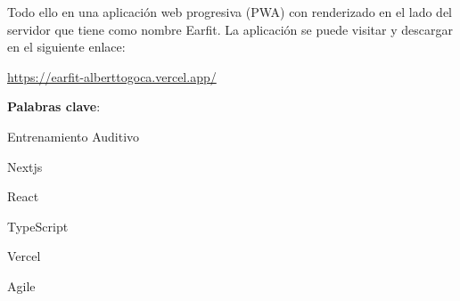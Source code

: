 \documentclass[12pt,twoside,titlepage]{report}
\newcommand\blankpage{%
    \newpage
    \null
    \thispagestyle{empty}%
    \newpage}
\begin{document}
Todo ello en una aplicación web progresiva (PWA) con renderizado en el lado del servidor que tiene como nombre Earfit. La aplicación se puede visitar y descargar en el siguiente enlace:

\url{https://earfit-alberttogoca.vercel.app/}

\mbox{} \bigskip

\noindent \textbf{Palabras clave}:
\begin{compactitem}
    \item Entrenamiento Auditivo
    \item Nextjs
    \item React
    \item TypeScript
    \item Vercel
    \item Agile
\end{compactitem}

\afterpage{\blankpage}


 

\setlength{\parskip}{1pt}
\renewcommand{\baselinestretch}{1}
\renewcommand{\contentsname}{Índice de contenidos}

\tableofcontents
\afterpage{\blankpage}

\listoffigures
\afterpage{\blankpage}




  


\pagestyle{fancy}
\renewcommand{\chaptermark}[1]{\markboth{Capítulo \thechapter.\ #1}{}}
\pagestyle{fancy}
\fancyhf{}
\fancyhead[LO]{\leftmark}
\fancyhead[RO]{}
\fancyhead[RE]{\nouppercase\rightmark}
\fancyhead[LE]{}
\fancyfoot[C]{\thepage}
\end{document}
